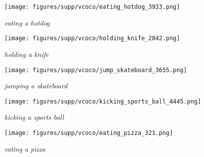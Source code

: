 \documentclass[10pt,twocolumn,letterpaper]{article}
\begin{document}
\begin{figure*}
\begin{subfigure}[t]{0.19\linewidth}
        \centering
        \texttt{[image: figures/supp/vcoco/eating\_hotdog\_3933.png]}
        \caption{\textit{eating a hotdog}}
        \label{fig:vcoco-eating-hotdog}
    \end{subfigure}
    \hfill \begin{subfigure}[t]{0.19\linewidth}
        \centering
        \texttt{[image: figures/supp/vcoco/holding\_knife\_2842.png]}
        \caption{\textit{holding a knife}}
        \label{fig:vcoco-holding-knife}
    \end{subfigure}
    \begin{subfigure}[t]{0.19\linewidth}
        \centering
        \texttt{[image: figures/supp/vcoco/jump\_skateboard\_3655.png]}
        \caption{\textit{jumping a skateboard}}
        \label{fig:vcoco-jumping-stakeboard}
    \end{subfigure}
    \hfill \begin{subfigure}[t]{0.19\linewidth}
        \centering
        \texttt{[image: figures/supp/vcoco/kicking\_sports\_ball\_4445.png]}
        \caption{\textit{kicking a sports ball}}
        \label{fig:vcoco-kicking-sportsball}
    \end{subfigure}
    \hfill \begin{subfigure}[t]{0.19\linewidth}
        \centering
        \texttt{[image: figures/supp/vcoco/eating\_pizza\_321.png]}
        \caption{\textit{eating a pizza}}
        \label{fig:vcoco-eating-pizza}
    \end{subfigure}


\end{figure*}
\end{document}
